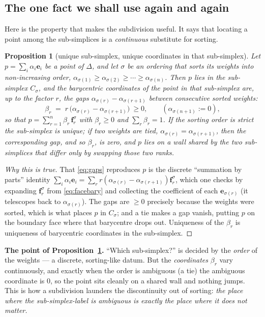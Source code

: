 \documentclass[11pt,a4paper]{article}
\theoremstyle{definition}
\theoremstyle{plain}
\newtheorem{proposition}[definition]{Proposition}
\newcommand{\bvec}[1]{\mathbf{#1}}
\begin{document}
\subsection{The one fact we shall use again and again}

Here is the property that makes the subdivision useful. It says that locating a
point among the sub-simplices is a \emph{continuous} substitute for sorting.

\begin{proposition}[unique sub-simplex, unique coordinates in that sub-simplex]\label{prop:cell}
Let $p=\sum_i\alpha_i\bvec e_i$ be a point of $\Delta$, and let $\sigma$ be an
ordering that sorts its weights into non-increasing order,
$\alpha_{\sigma(1)}\ge\alpha_{\sigma(2)}\ge\cdots\ge\alpha_{\sigma(n)}$. Then $p$
lies in the sub-simplex $C_\sigma$, and the barycentric coordinates of the point in that sub-simplex are, up to the
factor $r$, the \emph{gaps} $\alpha_{\sigma(r)}-\alpha_{\sigma(r+1)}$ between
consecutive sorted weights:
\begin{equation}\label{eq:gaps}
   \beta_r \;=\; r\,\bigl(\alpha_{\sigma(r)}-\alpha_{\sigma(r+1)}\bigr)\ \ge 0,
   \qquad (\alpha_{\sigma(n+1)}:=0),
\end{equation}
so that $p=\sum_{r=1}^n \beta_r\,\bvec f^\sigma_r$ with $\beta_r\ge0$ and
$\sum_r\beta_r=1$. If the sorting order is \emph{strict} the sub-simplex is unique; if
two weights are tied, $\alpha_{\sigma(r)}=\alpha_{\sigma(r+1)}$, then the
corresponding gap, and so $\beta_r$, is \emph{zero}, and $p$ lies on a wall
shared by the two sub-simplices that differ only by swapping those two ranks.
\end{proposition}

\begin{proof}[Why this is true]
That \eqref{eq:gaps} reproduces $p$ is the discrete ``summation by parts''
identity $\sum_i\alpha_i\bvec e_i=\sum_r r(\alpha_{\sigma(r)}-\alpha_{\sigma(r+1)})
\bvec f^\sigma_r$, which one checks by expanding $\bvec f^\sigma_r$ from
\eqref{eq:facebary} and collecting the coefficient of each $\bvec e_{\sigma(r)}$
(it telescopes back to $\alpha_{\sigma(r)}$). The gaps are $\ge0$ precisely
because the weights were sorted, which is what places $p$ in $C_\sigma$; and a
tie makes a gap vanish, putting $p$ on the boundary face where that barycentre
drops out. Uniqueness of the $\beta_r$ is uniqueness of barycentric coordinates
in the sub-simplex.
\end{proof}

\begin{tcolorbox}[ideabox]
\textbf{The point of Proposition~\ref{prop:cell}.} ``Which sub-simplex?'' is decided by
the \emph{order} of the weights --- a discrete, sorting-like datum. But the
\emph{coordinates} $\beta_r$ vary continuously, and exactly when the order is
ambiguous (a tie) the ambiguous coordinate is $0$, so the point sits cleanly on
a shared wall and nothing jumps. This is how a subdivision launders the
discontinuity out of sorting: \emph{the place where the sub-simplex-label is ambiguous
is exactly the place where it does not matter.}
\end{tcolorbox}
\end{document}
